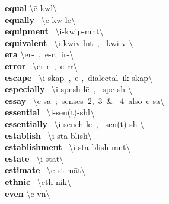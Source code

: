 \documentclass[10pt,a4paper]{article}
\begin{document}
\begin{multicols}{2}
\textbf{ equal }\quad \textbackslash \textprimstress \={e}-kw\textschwa l\textbackslash \\
\textbf{ equally }\quad \ \textbackslash \textprimstress \={e}-kw\textschwa -l\={e}\textbackslash \\
\textbf{ equipment }\quad \ \textbackslash i-\textprimstress kwip-m\textschwa nt\textbackslash \\
\textbf{ equivalent }\quad \ \textbackslash i-\textprimstress kwiv-l\textschwa nt\ ,\ -\textprimstress kwi-v\textschwa -\textbackslash \\
\textbf{ era }\quad \textbackslash \textprimstress er-\textschwa \ ,\ \textprimstress e-r\textschwa ,\ \textprimstress ir-\textschwa \textbackslash \\
\textbf{ error }\quad \ \textbackslash \textprimstress er-\textschwa r\ ,\ \textprimstress e-r\textschwa r\textbackslash \\
\textbf{ escape }\quad \ \textbackslash i-\textprimstress sk\={a}p\ ,\ e-,\ dialectal\ ik-\textprimstress sk\={a}p\textbackslash \\
\textbf{ especially }\quad \ \textbackslash i-\textprimstress spesh-l\={e}\ ,\ -\textprimstress spe-sh\textschwa -\textbackslash \\
\textbf{ essay }\quad \ \textbackslash \textprimstress e-\textsecstress s\={a}\ ;\ senses\ 2,\ 3\ \& \ 4\ also\ e-\textprimstress s\={a}\textbackslash \\
\textbf{ essential }\quad \ \textbackslash i-\textprimstress sen(t)-sh\textschwa l\textbackslash \\
\textbf{ essentially }\quad \ \textbackslash i-\textprimstress sench-l\={e}\ ,\ -\textprimstress sen(t)-sh\textschwa -\textbackslash \\
\textbf{ establish }\quad \ \textbackslash i-\textprimstress sta-blish\textbackslash \\
\textbf{ establishment }\quad \ \textbackslash i-\textprimstress sta-blish-m\textschwa nt\textbackslash \\
\textbf{ estate }\quad \ \textbackslash i-\textprimstress st\={a}t\textbackslash \\
\textbf{ estimate }\quad \ \textbackslash \textprimstress e-st\textschwa -\textsecstress m\={a}t\textbackslash \\
\textbf{ ethnic }\quad \ \textbackslash \textprimstress eth-nik\textbackslash \\
\textbf{ even }\quad \textbackslash \textprimstress \={e}-v\textschwa n\textbackslash \\

\end{multicols}
\end{document}
